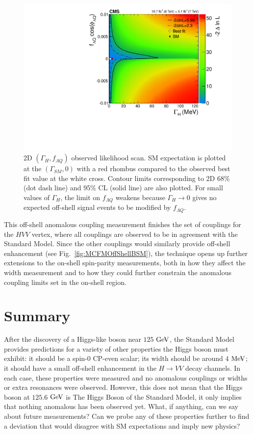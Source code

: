\begin{figure}[htbp]
\begin{center}
\includegraphics[width=.9\linewidth]{HiggsProperties/figures/width_2DScan_obs_2lnL.pdf}
\caption[2D $(\Gamma_{H},f_{\Lambda Q})$ Observed Likelihood Scan]{2D $(\Gamma_{H},f_{\Lambda Q})$ observed likelihood scan. SM expectation is plotted at the $(\Gamma_{SM},0)$ with a red rhombus compared to the observed best fit value at the white cross. Contour limits corresponding to 2D 68\% (dot dash line) and 95\% CL (solid line) are also plotted. For small values of $\Gamma_H$, the limit on $f_{\Lambda Q}$ weakens because $\Gamma_H\rightarrow0$ gives no expected off-shell signal events to be modified by $f_{\Lambda Q}$.}
\label{fig:2DWidthScan}
\end{center}
\end{figure}

This off-shell anomalous coupling measurement finishes the set of couplings for the $HVV$ vertex, where all couplings are observed to be in agreement with the Standard Model. Since the other couplings would similarly provide off-shell enhancement (see Fig.~\ref{fig:MCFMOffShellBSM}), the technique opens up further extensions to the on-shell spin-parity measurements, both in how they affect the width measurement and to how they could further constrain the anomalous coupling limits set in the on-shell region.

\section{Summary}
\label{sec:properties_summary}

After the discovery of a Higgs-like boson near $125$ $\rm{GeV}$, the Standard Model provides predictions for a variety of other properties the Higgs boson must exhibit: it should be a spin-0 CP-even scalar; its width should be around $4$ $\rm{MeV}$; it should have a small off-shell enhancement in the $H\rightarrow VV$ decay channels. In each case, these properties were measured and no anomalous couplings or widths or extra resonances were observed. However, this does not mean that the Higgs boson at $125.6$ $\rm{GeV}$ is The Higgs Boson of the Standard Model, it only implies that nothing anomalous has been observed yet. What, if anything, can we say about future measurements? Can we probe any of these properties further to find a deviation that would disagree with SM expectations and imply new physics?